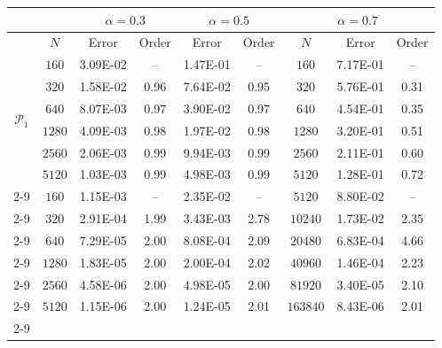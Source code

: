 \documentclass[11pt]{article}
\numberwithin{equation}{section}
\begin{document}
\begin{table}[!ht]\centering
\begin{tabular}{|c|c|cc|cc|c|cc|}
  \hline
  & & \multicolumn{2}{c|}{$\alpha=0.3$}&\multicolumn{2}{c|}{$\alpha=0.5$}&\multicolumn{3}{c|}{$\alpha=0.7$}\\ \hline
  & $N$ & Error & Order & Error  & Order& $N$ & Error &Order\\ \hline
\multirow{6}{0.6cm}{$\mathcal{P}_1$}& $  160$ &    3.09E-02&      --   &    1.47E-01&      --   & $   160$ &    7.17E-01&	  --   \\ \cline{2-9}
									& $  320$ &    1.58E-02&     0.96  &    7.64E-02&     0.95	& $   320$ &    5.76E-01&     0.31 \\ \cline{2-9}
									& $  640$ &    8.07E-03&     0.97  &    3.90E-02&     0.97	& $   640$ &    4.54E-01&     0.35 \\ \cline{2-9}
									& $ 1280$ &    4.09E-03&     0.98  &    1.97E-02&     0.98	& $  1280$ &    3.20E-01&     0.51 \\ \cline{2-9}
									& $ 2560$ &    2.06E-03&     0.99  &    9.94E-03&     0.99	& $  2560$ &    2.11E-01&     0.60 \\ \cline{2-9}
									& $ 5120$ &    1.03E-03&     0.99  &    4.98E-03&     0.99	& $  5120$ &    1.28E-01&     0.72 \\ \cline{2-9}
  \hline
\multirow{6}{0.6cm}{$\mathcal{P}_2$}& $  160$ &    1.15E-03&	   -- &    2.35E-02&	  --    & $  5120$&   8.80E-02&   --   \\ \cline{2-9}
									& $  320$ &    2.91E-04&     1.99 &    3.43E-03&     2.78	& $  10240$&  1.73E-02&     2.35   	 \\ \cline{2-9}
									& $  640$ &    7.29E-05&     2.00 &    8.08E-04&     2.09	& $  20480$&  6.83E-04&     4.66    	 \\ \cline{2-9}
									& $ 1280$ &    1.83E-05&     2.00 &    2.00E-04&     2.02	& $  40960$&  1.46E-04 &    2.23	 \\ \cline{2-9}
									& $ 2560$ &    4.58E-06&     2.00 &    4.98E-05&     2.00	& $  81920$&  3.40E-05 &    2.10 	 \\ \cline{2-9}
									& $ 5120$ &    1.15E-06&     2.00 &    1.24E-05&     2.01	& $  163840$& 8.43E-06 &    2.01	 \\ \cline{2-9} \hline


\end{tabular}
\end{table}
\end{document}
